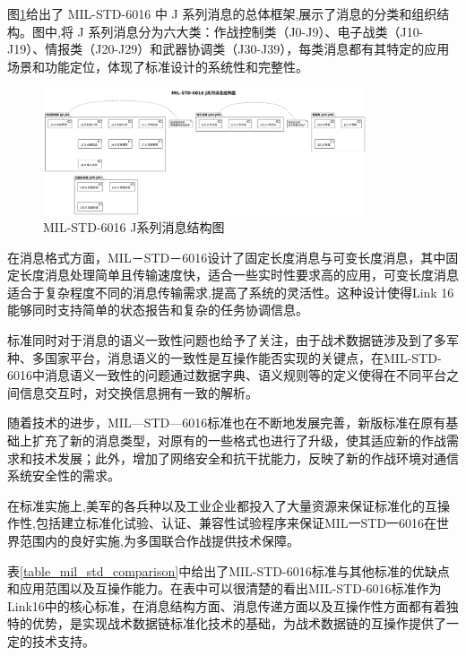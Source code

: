 图\ref{fig_j_series_message_structure}给出了 MIL-STD-6016 中 J 系列消息的总体框架,展示了消息的分类和组织结构。图中,将 J 系列消息分为六大类：作战控制类（J0-J9）、电子战类（J10-J19）、情报类（J20-J29）和武器协调类（J30-J39），每类消息都有其特定的应用场景和功能定位，体现了标准设计的系统性和完整性。

\begin{figure}[H]
    \centering
    \includegraphics[width=0.85\textwidth,height=0.6\textheight,keepaspectratio]{chapters/fig-0/j_series_message_structure.png}
    \caption{MIL-STD-6016 J系列消息结构图}
    \label{fig_j_series_message_structure}
\end{figure}

在消息格式方面，MIL－STD－6016设计了固定长度消息与可变长度消息，其中固定长度消息处理简单且传输速度快，适合一些实时性要求高的应用，可变长度消息适合于复杂程度不同的消息传输需求,提高了系统的灵活性。这种设计使得Link 16能够同时支持简单的状态报告和复杂的任务协调信息。

标准同时对于消息的语义一致性问题也给予了关注，由于战术数据链涉及到了多军种、多国家平台，消息语义的一致性是互操作能否实现的关键点，在MIL-STD-6016中消息语义一致性的问题通过数据字典、语义规则等的定义使得在不同平台之间信息交互时，对交换信息拥有一致的解析。

随着技术的进步，MIL—STD—6016标准也在不断地发展完善，新版标准在原有基础上扩充了新的消息类型，对原有的一些格式也进行了升级，使其适应新的作战需求和技术发展；此外，增加了网络安全和抗干扰能力，反映了新的作战环境对通信系统安全性的需求。

在标准实施上,美军的各兵种以及工业企业都投入了大量资源来保证标准化的互操作性,包括建立标准化试验、认证、兼容性试验程序来保证MIL一STD一6016在世界范围内的良好实施,为多国联合作战提供技术保障。

表\ref{table_mil_std_comparison}中给出了MIL-STD-6016标准与其他标准的优缺点和应用范围以及互操作能力。在表中可以很清楚的看出MIL-STD-6016标准作为Link16中的核心标准，在消息结构方面、消息传递方面以及互操作性方面都有着独特的优势，是实现战术数据链标准化技术的基础，为战术数据链的互操作提供了一定的技术支持。

